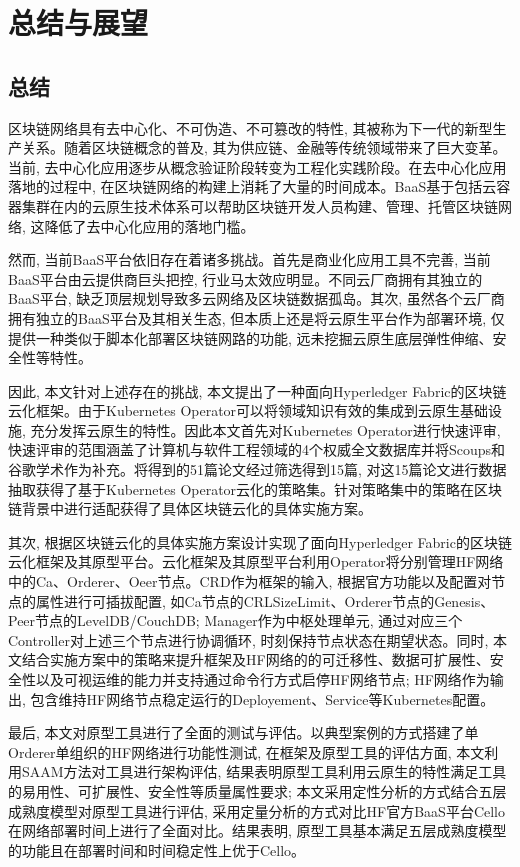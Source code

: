 \chapter{总结与展望}

\section{总结}

区块链网络具有去中心化、不可伪造、不可篡改的特性, 其被称为下一代的新型生产关系。随着区块链概念的普及, 其为供应链、金融等传统领域带来了巨大变革。当前, 去中心化应用逐步从概念验证阶段转变为工程化实践阶段。在去中心化应用落地的过程中, 在区块链网络的构建上消耗了大量的时间成本。BaaS基于包括云容器集群在内的云原生技术体系可以帮助区块链开发人员构建、管理、托管区块链网络, 这降低了去中心化应用的落地门槛。

然而, 当前BaaS平台依旧存在着诸多挑战。首先是商业化应用工具不完善, 当前BaaS平台由云提供商巨头把控, 行业马太效应明显。不同云厂商拥有其独立的BaaS平台, 缺乏顶层规划导致多云网络及区块链数据孤岛。其次, 虽然各个云厂商拥有独立的BaaS平台及其相关生态, 但本质上还是将云原生平台作为部署环境, 仅提供一种类似于脚本化部署区块链网路的功能, 远未挖掘云原生底层弹性伸缩、安全性等特性。

因此, 本文针对上述存在的挑战, 本文提出了一种面向Hyperledger Fabric的区块链云化框架。由于Kubernetes Operator可以将领域知识有效的集成到云原生基础设施, 充分发挥云原生的特性。因此本文首先对Kubernetes Operator进行快速评审, 快速评审的范围涵盖了计算机与软件工程领域的4个权威全文数据库并将Scoups和谷歌学术作为补充。将得到的51篇论文经过筛选得到15篇, 对这15篇论文进行数据抽取获得了基于Kubernetes Operator云化的策略集。针对策略集中的策略在区块链背景中进行适配获得了具体区块链云化的具体实施方案。

其次, 根据区块链云化的具体实施方案设计实现了面向Hyperledger Fabric的区块链云化框架及其原型平台。云化框架及其原型平台利用Operator将分别管理HF网络中的Ca、Orderer、Oeer节点。CRD作为框架的输入, 根据官方功能以及配置对节点的属性进行可插拔配置, 如Ca节点的CRLSizeLimit、Orderer节点的Genesis、Peer节点的LevelDB/CouchDB; Manager作为中枢处理单元, 通过对应三个Controller对上述三个节点进行协调循环, 时刻保持节点状态在期望状态。同时, 本文结合实施方案中的策略来提升框架及HF网络的的可迁移性、数据可扩展性、安全性以及可视运维的能力并支持通过命令行方式启停HF网络节点; HF网络作为输出, 包含维持HF网络节点稳定运行的Deployement、Service等Kubernetes配置。

最后, 本文对原型工具进行了全面的测试与评估。以典型案例的方式搭建了单Orderer单组织的HF网络进行功能性测试, 在框架及原型工具的评估方面, 本文利用SAAM方法对工具进行架构评估, 结果表明原型工具利用云原生的特性满足工具的易用性、可扩展性、安全性等质量属性要求; 本文采用定性分析的方式结合五层成熟度模型对原型工具进行评估, 采用定量分析的方式对比HF官方BaaS平台Cello在网络部署时间上进行了全面对比。结果表明, 原型工具基本满足五层成熟度模型的功能且在部署时间和时间稳定性上优于Cello。

